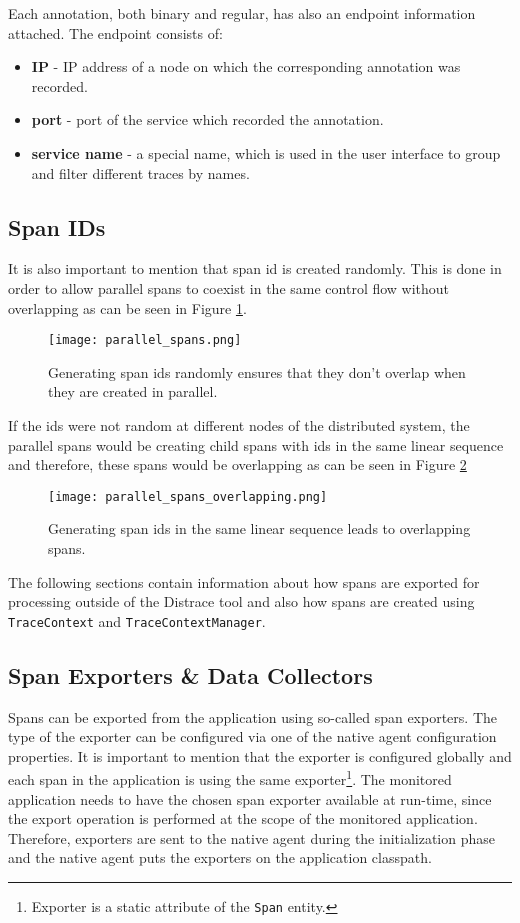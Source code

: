 Each annotation, both binary and regular, has also an endpoint information attached. The endpoint consists of:
\begin{itemize}
	\item \textbf{IP} - IP address of a node on which the corresponding annotation was recorded.
	\item \textbf{port} - port of the service which recorded the annotation.
	\item \textbf{service name} - a special name, which is used in the user interface to group and filter different traces by names.
\end{itemize}

\subsection{Span IDs}
It is also important to mention that span id is created randomly. This is done in order to allow parallel spans to coexist in the same control flow without overlapping as can be seen in Figure \ref{fig:parallel_spans}.

	\begin{figure}
		\centering
		\texttt{[image: parallel\_spans.png]}
		\caption{Generating span ids randomly ensures that they don't overlap when they are created in parallel.}
		\label{fig:parallel_spans}
	\end{figure}
If the ids were not random at different nodes of the distributed system, the parallel spans would be creating child spans with ids in the same linear sequence and therefore, these spans would be overlapping as can be seen in Figure \ref{fig:parallel_spans_overlapping}
	\begin{figure}
		\centering
		\texttt{[image: parallel\_spans\_overlapping.png]}
		\caption{Generating span ids in the same linear sequence leads to overlapping spans.}
		\label{fig:parallel_spans_overlapping}
	\end{figure}
	
The following sections contain information about how spans are exported for processing outside of the Distrace tool and also how spans are created using \texttt{TraceContext} and \texttt{TraceContextManager}.
\subsection{Span Exporters \& Data Collectors}
\label{design:exporter}
Spans can be exported from the application using so-called span exporters. The type of the exporter can be configured via one of the native agent configuration properties. It is important to mention that the exporter is configured globally and each span in the application is using the same exporter\footnote{Exporter is a static attribute of the \texttt{Span} entity.}. The monitored application needs to have the chosen span exporter available at run-time, since the export operation is performed at the scope of the monitored application. Therefore, exporters are sent to the native agent during the initialization phase and the native agent puts the exporters on the application classpath.

